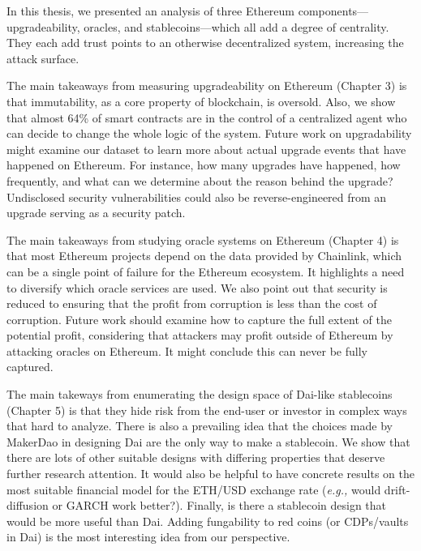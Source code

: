 \documentclass[letterpaper,12pt,onecolumn,final]{report}
\newcommand{\eg}{\textit{e.g.,}\xspace}
\begin{document}
In this thesis, we presented an analysis of three Ethereum components---upgradeability, oracles, and stablecoins---which all add a degree of centrality. They each add trust points to an otherwise decentralized system, increasing the attack surface.

The main takeaways from measuring upgradeability on Ethereum (Chapter 3) is that immutability, as a core property of blockchain, is oversold. Also, we show that almost 64\% of smart contracts are in the control of a centralized agent who can decide to change the whole logic of the system. Future work on upgradability might examine our dataset to learn more about actual upgrade events that have happened on Ethereum. For instance, how many upgrades have happened, how frequently, and what can we determine about the reason behind the upgrade? Undisclosed security vulnerabilities could also be reverse-engineered from an upgrade serving as a security patch. 

The main takeaways from studying oracle systems on Ethereum (Chapter 4) is that most Ethereum projects depend on the data provided by Chainlink, which can be a single point of failure for the Ethereum ecosystem. It highlights a need to diversify which oracle services are used. We also point out that security is reduced to ensuring that the profit from corruption is less than the cost of corruption. Future work should examine how to capture the full extent of the potential profit, considering that attackers may profit outside of Ethereum by attacking oracles on Ethereum. It might conclude this can never be fully captured. 

The main takeways from enumerating the design space of Dai-like stablecoins (Chapter 5) is that they hide risk from the end-user or investor in complex ways that hard to analyze. There is also a prevailing idea that the choices made by MakerDao in designing Dai are the only way to make a stablecoin. We show that there are lots of other suitable designs with differing properties that deserve further research attention. It would also be helpful to have concrete results on the most suitable financial model for the ETH/USD exchange rate (\eg would drift-diffusion or GARCH work better?). Finally, is there a stablecoin design that would be more useful than Dai. Adding fungability to red coins (or CDPs/vaults in Dai) is the most interesting idea from our perspective.

\clearpage
{}
{}  %
\singlespacing %


\end{document}

